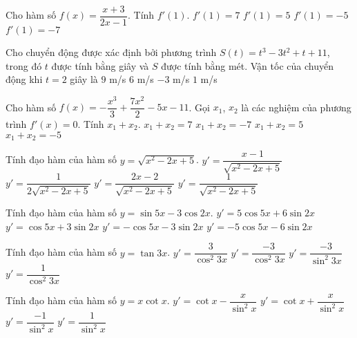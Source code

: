 \begin{ex}%
Cho hàm số $f(x)=\dfrac{x+3}{2x-1}$. Tính $f'(1)$.
\choice
{$f'(1)=7$}
{$f'(1)=5$}
{$f'(1)=-5$}
{\True $f'(1)=-7$}
\end{ex}
\begin{ex}%
Cho chuyển động được xác định bởi phương trình $S(t)=t^{3}-3t^{2}+t+11$, trong đó $t$ được tính bằng giây và $S$ được tính bằng mét. Vận tốc của chuyển động khi $t=2$ giây là
\choice
{$9$ m/s}
{$6$ m/s}
{$-3$ m/s}
{\True $1$ m/s}
\end{ex}
\begin{ex}%
Cho hàm số $f(x)=-\dfrac{x^{3}}{3}+\dfrac{7x^{2}}{2}-5x-11$. Gọi $x_{1}$, $x_{2}$ là các nghiệm của phương trình $f'(x)=0$. Tính $x_{1}+x_{2}$.
\choice
{$x_{1}+x_{2}=7$}
{\True $x_{1}+x_{2}=-7$}
{$x_{1}+x_{2}=5$}
{$x_{1}+x_{2}=-5$}
\end{ex}
\begin{ex}%
Tính đạo hàm của hàm số $y=\sqrt{x^{2}-2x+5}$.
\choice
{\True $y'=\dfrac{x-1}{\sqrt{x^{2}-2x+5}}$}
{$y'=\dfrac{1}{2\sqrt{x^{2}-2x+5}}$}
{$y'=\dfrac{2x-2}{\sqrt{x^{2}-2x+5}}$}
{$y'=\dfrac{1}{\sqrt{x^{2}-2x+5}}$}
\end{ex}
\begin{ex}%
Tính đạo hàm của hàm số $y=\sin 5x-3\cos 2x$.
\choice
{\True $y'=5\cos 5x+6\sin 2x$}
{$y'=\cos 5x+3\sin 2x$}
{$y'=-\cos 5x-3\sin 2x$}
{$y'=-5\cos 5x-6\sin 2x$}
\end{ex}
\begin{ex}%
Tính đạo hàm của hàm số $y=\tan 3x$.
\choice
{\True $y'=\dfrac{3}{\cos^{2}3x}$}
{$y'=\dfrac{-3}{\cos^{2}3x}$}
{$y'=\dfrac{-3}{\sin^{2}3x}$}
{$y'=\dfrac{1}{\cos^{2}3x}$}
\end{ex}
\begin{ex}%
Tính đạo hàm của hàm số $y=x\cot x$.
\choice
{\True $y'=\cot x-\dfrac{x}{\sin^{2}x}$}
{$y'=\cot x+\dfrac{x}{\sin^{2}x}$}
{$y'=\dfrac{-1}{\sin^{2}x}$}
{$y'=\dfrac{1}{\sin^{2}x}$}
\end{ex}
